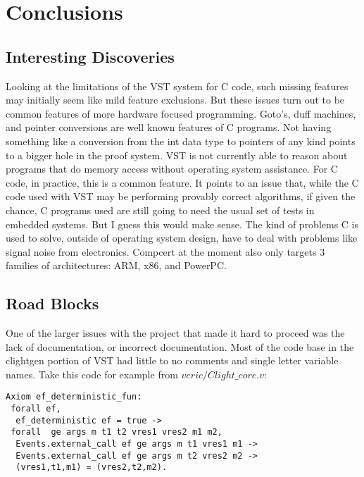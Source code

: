 \section{Conclusions}
\label{sec:conclusions}

\subsection{Interesting Discoveries}

Looking at the limitations of the VST system for C code, such missing features may initially seem like mild feature exclusions. But these issues turn out to be common features of more hardware focused programming. Goto's, duff machines, and pointer conversions are well known features of C programs. Not having something like a conversion from the int data type to pointers of any kind points to a bigger hole in the proof system. VST is not currently able to reason about programs that do memory access without operating system assistance. For C code, in practice, this is a common feature. It points to an issue that, while the C code used with VST may be performing provably correct algorithms, if given the chance, C programs used are still going to need the usual set of tests in embedded systems. But I guess this would make sense. The kind of problems C is used to solve, outside of operating system design, have to deal with problems like signal noise from electronics. Compcert at the moment also only targets 3 families of architectures: ARM, x86, and PowerPC.


\subsection{Road Blocks}

One of the larger issues with the project that made it hard to proceed was the lack of documentation, or incorrect documentation. Most of the code base in the clightgen portion of VST had little to no comments and single letter variable names. Take this code for example from $veric/Clight\_core.v$: \\

\begin{verbatim}
Axiom ef_deterministic_fun:
 forall ef,
  ef_deterministic ef = true ->
 forall  ge args m t1 t2 vres1 vres2 m1 m2,
  Events.external_call ef ge args m t1 vres1 m1 ->
  Events.external_call ef ge args m t2 vres2 m2 ->
  (vres1,t1,m1) = (vres2,t2,m2).
\end{verbatim}
\\

